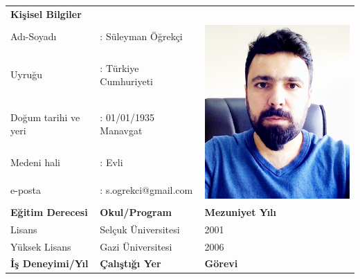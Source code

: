 \documentclass[
oneside, %
doktora, %
]{aufbetez} %
\begin{document}


\begin{ozgecmis}
	\begin{table}[htbp]
		\doublespacing
		\setlength{\tabcolsep}{18pt}
		\begin{tabular}{lll}
			\textbf{Kişisel Bilgiler}        &                         &                                 \\
			Adı-Soyadı              & : Süleyman Öğrekçi      & \multirow{5}{*}{\includegraphics[scale=0.35]{profilresmi}}   \\
			Uyruğu                  & : Türkiye Cumhuriyeti   &                                 \\
			Doğum tarihi ve yeri    & : 01/01/1935 Manavgat   &                                 \\
			Medeni hali             & : Evli                  &                                 \\
			e-posta                 & : s.ogrekci@gmail.com   &                                 \\
			\textbf{Eğitim Derecesi}         & \textbf{Okul/Program}            & \textbf{Mezuniyet Yılı}                  \\
			Lisans                  & Selçuk Üniversitesi     & 2001                            \\
			Yüksek Lisans           & Gazi Üniversitesi       & 2006                            \\
			\textbf{İş Deneyimi/Yıl}         & \textbf{Çalıştığı Yer}           & \textbf{Görevi}                          \\

\end{tabular}
\end{table}
\end{ozgecmis}
\end{document}

